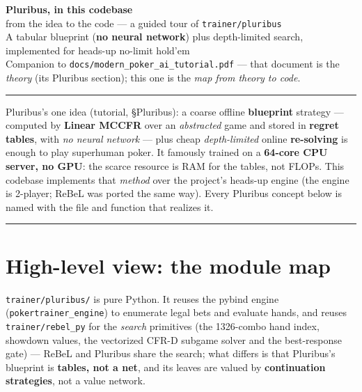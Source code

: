 \documentclass[11pt,a4paper]{article}
\newcommand{\file}[1]{\textcolor{accent}{\texttt{#1}}}
\begin{document}
\begin{center}
  {\Huge\bfseries Pluribus, in this codebase}\\[2mm]
  {\large from the idea to the code --- a guided tour of \texttt{trainer/pluribus}}\\[3mm]
  {\normalsize A tabular blueprint (\textbf{no neural network}) plus depth-limited
   search, implemented for heads-up no-limit hold'em}\\[2mm]
  {\small Companion to \texttt{docs/modern\_poker\_ai\_tutorial.pdf} --- that document
   is the \emph{theory} (its Pluribus section); this one is the \emph{map from
   theory to code}.}
\end{center}
\vspace{2mm}
\hrule
\vspace{3mm}

\begin{intuition}
Pluribus's one idea (tutorial, §Pluribus): a coarse offline \textbf{blueprint}
strategy --- computed by \textbf{Linear MCCFR} over an \emph{abstracted} game and
stored in \textbf{regret tables}, with \emph{no neural network} --- plus cheap
\emph{depth-limited} online \textbf{re-solving} is enough to play superhuman poker.
It famously trained on a \textbf{64-core CPU server, no GPU}: the scarce resource
is RAM for the tables, not FLOPs. This codebase implements that \emph{method} over
the project's heads-up engine (the engine is 2-player; ReBeL was ported the same
way). Every Pluribus concept below is named with the file and function that
realizes it.
\end{intuition}

\tableofcontents
\vspace{3mm}\hrule

\section{High-level view: the module map}

\file{trainer/pluribus/} is pure Python. It reuses the pybind engine
(\texttt{pokertrainer\_engine}) to enumerate legal bets and evaluate hands, and
reuses \file{trainer/rebel\_py} for the \emph{search} primitives (the 1326-combo
hand index, showdown values, the vectorized CFR-D subgame solver and the
best-response gate) --- ReBeL and Pluribus share the search; what differs is that
Pluribus's blueprint is \textbf{tables, not a net}, and its leaves are valued by
\textbf{continuation strategies}, not a value network.
\end{document}
